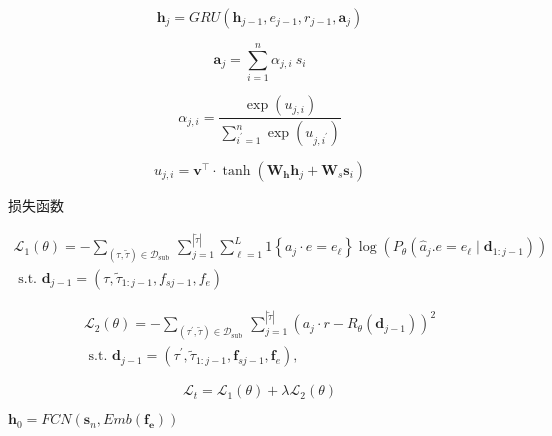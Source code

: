 \begin{equation} \mathbf{h}_{j}=G R U\left(\mathbf{h}_{j-1}, e_{j-1}, r_{j-1}, \mathbf{a}_{j}\right) \end{equation}

\begin{equation}
\mathbf{a}_{j}=\sum_{i=1}^{n} \alpha_{j, i} {~s}_{i}
\end{equation}

\begin{equation}
\alpha_{j, i}=\frac{\exp \left(u_{j, i}\right)}{\sum_{i^{\prime}=1}^{n} \exp \left(u_{j, i^{\prime}}\right)}
\end{equation}

\begin{equation}
u_{j, i}=\mathbf{v}^{\top} \cdot \tanh \left(\mathbf{W}_{\mathbf{h}} \mathbf{h}_{j}+\mathbf{W}_{s} \mathbf{s}_{i}\right)
\end{equation}

损失函数

\begin{equation}
\begin{gathered}
\mathcal{L}_{1}(\theta)=-\sum_{(\tau, \tilde{\tau}) \in \mathcal{D}_{\text {sub }}} \sum_{j=1}^{|\tilde{\tau}|} \sum_{\ell=1}^{L} 1\left\{a_{j} \cdot e=e_{\ell}\right\} \log \left(P_{\theta}\left(\hat{a}_{j} . e=e_{\ell} \mid \mathbf{d}_{1: j-1}\right)\right) \\
\text { s.t. } \mathbf{d}_{j-1}=\left(\tau, \tilde{\tau}_{1: j-1}, {f}_{{s} j-1}, {f}_{{e}}\right)
\end{gathered}
\end{equation}

\begin{equation}
\begin{aligned}
\mathcal{L}_{2}(\theta)=-\sum_{\left(\tau^{\prime}, \tilde{\tau}\right) \in \mathcal{D}_{\text {sub }}} \sum_{j=1}^{|\tilde{\tau}|}\left(a_{j} \cdot r-R_{\theta}\left(\mathbf{d}_{j-1}\right)\right)^{2} \\
\text { s.t. } \mathbf{d}_{j-1}=\left(\tau^{\prime}, \tilde{\tau}_{1: j-1}, \mathbf{f}_{{s} j-1}, \mathbf{f}_{{e}}\right),
\end{aligned}
\end{equation}

\begin{equation}\mathcal{L}_t = \mathcal{L}_1(\theta) + \lambda \mathcal{L}_2(\theta)\end{equation}

$\mathbf{h}_{0}=FCN(\mathbf{s} _n, Emb(\mathbf{f_e} ))$

